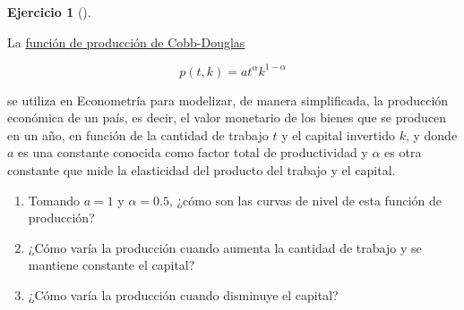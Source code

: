 \documentclass[
  a4paper,
]{scrreport}
\theoremstyle{definition}
\newtheorem{exercise}{Ejercicio}[chapter]
\theoremstyle{remark}
\begin{document}
\begin{exercise}[]\protect\hypertarget{exr-produccion-economica}{}\label{exr-produccion-economica}

La
\href{https://es.wikipedia.org/wiki/Funci\%C3\%B3n_de_producci\%C3\%B3n_de_Cobb-Douglas}{función
de producción de Cobb-Douglas}

\[p(t,k) = at^\alpha k^{1-\alpha }\]

se utiliza en Econometría para modelizar, de manera simplificada, la
producción económica de un país, es decir, el valor monetario de los
bienes que se producen en un año, en función de la cantidad de trabajo
\(t\) y el capital invertido \(k\), y donde \(a\) es una constante
conocida como factor total de productividad y \(\alpha\) es otra
constante que mide la elasticidad del producto del trabajo y el capital.

\begin{enumerate}
\def\labelenumi{\alph{enumi}.}
\item
  Tomando \(a=1\) y \(\alpha=0.5\), ¿cómo son las curvas de nivel de
  esta función de producción?
\item
  ¿Cómo varía la producción cuando aumenta la cantidad de trabajo y se
  mantiene constante el capital?
\item
  ¿Cómo varía la producción cuando disminuye el capital?
\end{enumerate}

\end{exercise}
\end{document}
